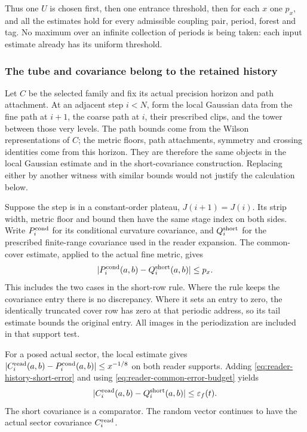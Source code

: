 Thus one $U$ is chosen first, then one entrance threshold, then
for each $x$ one $p_x$, and all the estimates hold for every
admissible coupling pair, period, forest and tag. No maximum over
an infinite collection of periods is being taken: each input
estimate already has its uniform threshold.

\subsubsection{The tube and covariance belong to the retained history}

Let $C$ be the selected family and fix its actual precision horizon
and path attachment. At an adjacent step $i<N$, form the local
Gaussian data from the fine path at $i+1$, the coarse path at $i$,
their prescribed clips, and the tower between those very levels.
The path bounds come from the Wilson representations of $C$;
the metric floors, path attachments, symmetry and crossing
identities come from this horizon. They are therefore the same
objects in the local Gaussian estimate and in the short-covariance
construction. Replacing either by another witness with similar
bounds would not justify the calculation below.

Suppose the step is in a constant-order plateau,
$J(i+1)=J(i)$. Its strip width, metric floor and bound then have
the same stage index on both sides. Write $P_i^{\rm cond}$ for
its conditional curvature covariance, and $Q_i^{\rm short}$ for
the prescribed finite-range covariance used in the reader
expansion. The common-cover estimate, applied to the actual fine
metric, gives
\begin{equation}\label{eq:reader-history-short-error}
 |P_i^{\rm cond}(a,b)-Q_i^{\rm short}(a,b)|\le p_x.
\end{equation}
This includes the two cases in the short-row rule. Where the rule
keeps the covariance entry there is no discrepancy. Where it
sets an entry to zero, the identically truncated cover row has
zero at that periodic address, so its tail estimate bounds the
original entry. All images in the periodization are included in
that support test.

For a posed actual sector, the local estimate gives
$|C_i^{\rm read}(a,b)-P_i^{\rm cond}(a,b)|\le x^{-1/8}$ on
both reader supports. Adding \eqref{eq:reader-history-short-error}
and using \eqref{eq:reader-common-error-budget} yields
\begin{equation}\label{eq:reader-selected-sight}
 |C_i^{\rm read}(a,b)-Q_i^{\rm short}(a,b)|
 \le\varepsilon_f(t).
\end{equation}
The short covariance is a comparator. The random vector continues
to have the actual sector covariance $C_i^{\rm read}$.

